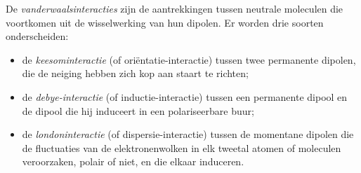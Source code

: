 \begin{definition}[Vanderwaalsinteracties]\label{def:b1:intermolecular-forces-solvents:vdw}
De \emph{vanderwaalsinteracties} zijn de
aantrekkingen tussen neutrale moleculen die voortkomen uit de
wisselwerking van hun dipolen. Er worden drie soorten onderscheiden:
\begin{itemize}
  \item de \emph{keesominteractie} (of
        oriëntatie-interactie) tussen twee permanente dipolen, die de
        neiging hebben zich kop aan staart te richten;
  \item de \emph{debye-interactie} (of
        inductie-interactie) tussen een permanente dipool en de dipool
        die hij induceert in een polariseerbare buur;
  \item de \emph{londoninteractie} (of
        dispersie-interactie) tussen de momentane dipolen die de
        fluctuaties van de elektronenwolken in elk tweetal atomen of
        moleculen veroorzaken, polair of niet, en die elkaar induceren.
\end{itemize}
\end{definition}

